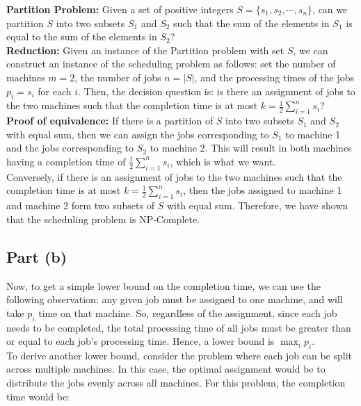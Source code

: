 \documentclass[a4paper]{article}
\begin{document}
\noindent
\textbf{Partition Problem:} Given a set of positive integers $S = \{s_1, s_2, \cdots, s_n\}$, can we partition $S$ into two subsets $S_1$ and $S_2$ such that the sum of the elements in $S_1$ is equal to the sum of the elements in $S_2$?\\

\noindent
\textbf{Reduction:} Given an instance of the Partition problem with set $S$, we can construct an instance of the scheduling problem as follows: set the number of machines $m = 2$, the number of jobs $n = |S|$, and the processing times of the jobs $p_i = s_i$ for each $i$. Then, the decision question is: is there an assignment of jobs to the two machines such that the completion time is at most $k = \frac{1}{2} \sum_{i=1}^{n} s_i$?\\

\noindent
\textbf{Proof of equivalence:} If there is a partition of $S$ into two subsets $S_1$ and $S_2$ with equal sum, then we can assign the jobs corresponding to $S_1$ to machine 1 and the jobs corresponding to $S_2$ to machine 2. This will result in both machines having a completion time of $\frac{1}{2} \sum_{i=1}^{n} s_i$, which is what we want.\\

\noindent
Conversely, if there is an assignment of jobs to the two machines such that the completion time is at most $k = \frac{1}{2} \sum_{i=1}^{n} s_i$, then the jobs assigned to machine 1 and machine 2 form two subsets of $S$ with equal sum. Therefore, we have shown that the scheduling problem is NP-Complete.

\vspace{0.2in}
\subsection*{Part (b)}
Now, to get a simple lower bound on the completion time, we can use the following observation: any given job must be assigned to one machine, and will take $p_i$ time on that machine. So, regardless of the assignment, since each job needs to be completed, the total processing time of all jobs must be greater than or equal to each job's processing time. Hence, a lower bound is $\max_i p_i$.\\

\noindent
To derive another lower bound, consider the problem where each job can be split across multiple machines. In this case, the optimal assignment would be to distribute the jobs evenly across all machines. For this problem, the completion time would be:
\end{document}
